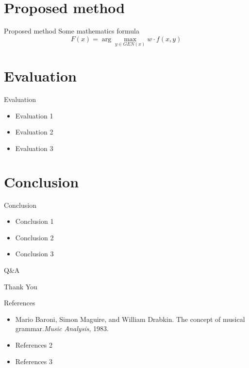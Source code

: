 \documentclass[13spt]{beamer}
\newcommand{\argmax}{\arg\!\max}
\begin{document}
\section{Proposed method}
\begin{frame}{Proposed method}
	Some mathematics formula $$F(x) = \argmax_{y \in GEN(x)} w \cdot f(x, y)$$
\end{frame}


\section{Evaluation}
\begin{frame}{Evaluation}
	\begin{itemize}
		\item Evaluation 1
		\item Evaluation 2
		\item Evaluation 3
	\end{itemize}
\end{frame}


\section{Conclusion}
\begin{frame}{Conclusion}
	\begin{itemize}
		\item Conclusion 1
		\item Conclusion 2
		\item Conclusion 3
	\end{itemize}
\end{frame}

\begin{frame}{Q\&A}
	\begin{center}
		\Huge Thank You
	\end{center}
\end{frame}

\begin{frame}{References}
	\begin{itemize}
		\item Mario Baroni, Simon Maguire, and William Drabkin. The concept of musical grammar.\textit{Music Analysis}, 1983.
		\item References 2
		\item References 3
	\end{itemize}
\end{frame}
\end{document}
